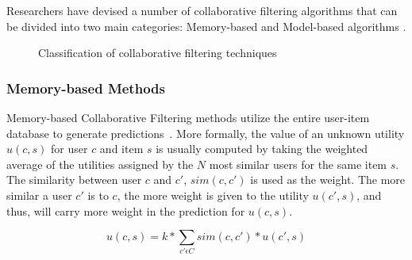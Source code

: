 Researchers have devised a number of collaborative filtering algorithms that
can be divided into two main categories: Memory-based and Model-based
algorithms \cite{Su2009}.

\begin{figure}[H]
    \centering
    \caption[Classification of collaborative filtering techniques]{Classification of collaborative filtering techniques}
    \label{figure:cftaxonomy}
\end{figure}

\subsubsection{Memory-based Methods}

Memory-based Collaborative Filtering methods utilize the entire user-item
database to generate predictions~\cite{Lin1994}. More formally, the value of an unknown
utility $u(c,s)$ for user $c$ and item $s$ is usually computed by taking the
weighted average of the utilities assigned by the $N$ most similar users for
the same item $s$. The similarity between user $c$ and $c'$, $sim(c, c')$ is
used as the weight. The more similar a user $c'$ is to $c$, the more weight is
given to the utility $u(c', s)$, and thus, will carry more weight in the
prediction for $u(c,s)$.

\begin{equation}
\label{equation:cfratingprediction}
u(c,s) = k * \sum_{c' \epsilon C} sim(c, c') * u(c',s)
\end{equation}

